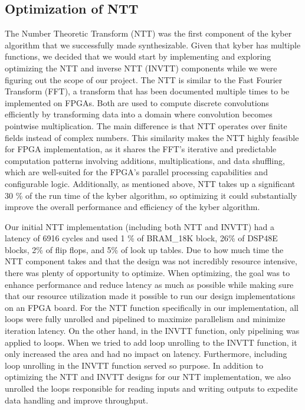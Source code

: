 
\subsection*{Optimization of NTT}

    The Number Theoretic Transform (NTT) was the first component of the kyber algorithm that we successfully made synthesizable.
Given that kyber has multiple functions, we decided that we would start by implementing and exploring optimizing the NTT and
inverse NTT (INVTT) components while we were figuring out the scope of our project. The NTT is similar to the Fast Fourier 
Transform (FFT), a transform that has been documented multiple times to be implemented on FPGAs. Both are used to compute
discrete convolutions efficiently by transforming data into a domain where convolution becomes pointwise multiplication. 
The main difference is that NTT operates over finite fields instead of complex numbers. This similarity makes the NTT highly
feasible for FPGA implementation, as it shares the FFT's iterative and predictable computation patterns involving additions,
multiplications, and data shuffling, which are well-suited for the FPGA’s parallel processing capabilities and configurable logic.
Additionally, as mentioned above, NTT takes up a significant 30 \% of the run time of the kyber algorithm, so optimizing it could
substantially improve the overall performance and efficiency of the kyber algorithm.  
  
   Our initial NTT implementation (including both NTT and INVTT) had a latency of 6916 cycles and used 1 \% of BRAM\_18K block,
26\% of DSP48E blocks, 2\% of  flip flops, and 5\% of look up tables. Due to how much time the NTT component takes and that the 
design was not incredibly resource intensive, there was plenty of opportunity to optimize. When optimizing, the goal was to
enhance performance and reduce latency as much as possible while making sure that our resource utilization made it possible to
run our design implementations on an FPGA board. For the NTT function specifically in our implementation, all loops were fully
unrolled and pipelined to maximize parallelism and minimize iteration latency. On the other hand, in the INVTT function, only
pipelining was applied to loops. When we tried to add loop unrolling to the INVTT function, it only increased the area and had
no impact on latency. Furthermore, including loop unrolling in the INVTT function served so purpose. In addition to optimizing
the NTT and INVTT designs for our NTT implementation, we also unrolled the loops responsible for reading inputs and writing outputs
to expedite data handling and improve throughput. 

